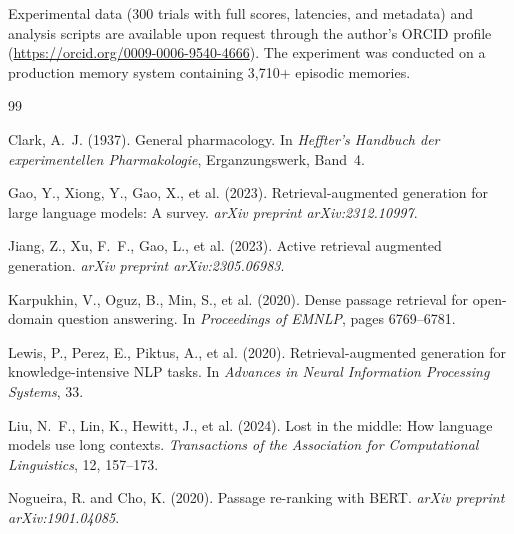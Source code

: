 \documentclass[11pt,a4paper]{article}
\begin{document}
Experimental data (300 trials with full scores, latencies, and metadata) and analysis scripts are available upon request through the author's ORCID profile (\url{https://orcid.org/0009-0006-9540-4666}). The experiment was conducted on a production memory system containing 3,710+ episodic memories.


\begin{thebibliography}{99}

Clark, A.~J. (1937).
\newblock General pharmacology.
\newblock In \emph{Heffter's Handbuch der experimentellen Pharmakologie}, Erganzungswerk, Band~4.

Gao, Y., Xiong, Y., Gao, X., et al. (2023).
\newblock Retrieval-augmented generation for large language models: A survey.
\newblock \emph{arXiv preprint arXiv:2312.10997}.

Jiang, Z., Xu, F.~F., Gao, L., et al. (2023).
\newblock Active retrieval augmented generation.
\newblock \emph{arXiv preprint arXiv:2305.06983}.

Karpukhin, V., Oguz, B., Min, S., et al. (2020).
\newblock Dense passage retrieval for open-domain question answering.
\newblock In \emph{Proceedings of EMNLP}, pages 6769--6781.

Lewis, P., Perez, E., Piktus, A., et al. (2020).
\newblock Retrieval-augmented generation for knowledge-intensive {NLP} tasks.
\newblock In \emph{Advances in Neural Information Processing Systems}, 33.

Liu, N.~F., Lin, K., Hewitt, J., et al. (2024).
\newblock Lost in the middle: How language models use long contexts.
\newblock \emph{Transactions of the Association for Computational Linguistics}, 12, 157--173.

Nogueira, R. and Cho, K. (2020).
\newblock Passage re-ranking with {BERT}.
\newblock \emph{arXiv preprint arXiv:1901.04085}.

\end{thebibliography}
\end{document}
